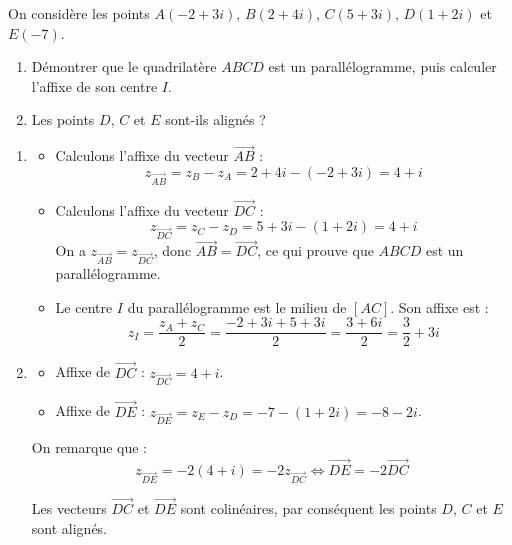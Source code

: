 \begin{methode}
	On considère les points $A(-2 + 3i)$, $B(2 + 4i)$, $C(5 + 3i)$, $D(1 + 2i)$ et $E(-7)$.
	\begin{enumerate}
		\item Démontrer que le quadrilatère $ABCD$ est un parallélogramme, puis calculer l'affixe de son centre $I$.
		\item Les points $D$, $C$ et $E$ sont-ils alignés ?
	\end{enumerate}

	\begin{correction}
		\nline
		\begin{enumerate}
			\item \begin{itemize}
				      \item Calculons l'affixe du vecteur $\vec{AB}$ :
				            \[
					            z_{\vec{AB}} = z_B - z_A = 2 + 4i - (-2 + 3i) = 4 + i
				            \]
				      \item Calculons l'affixe du vecteur $\vec{DC}$ :
				            \[
					            z_{\vec{DC}} = z_C - z_D = 5 + 3i - (1 + 2i) = 4 + i
				            \]
				            On a $z_{\vec{AB}} = z_{\vec{DC}}$, donc $\vec{AB} = \vec{DC}$, ce qui prouve que $ABCD$ est un parallélogramme.
				      \item Le centre $I$ du parallélogramme est le milieu de $[AC]$. Son affixe est :
				            \[
					            z_I = \frac{z_A + z_C}{2} = \frac{-2 + 3i + 5 + 3i}{2} = \frac{3 + 6i}{2} = \frac{3}{2} + 3i
				            \]
			      \end{itemize}
			\item \begin{itemize}
				      \item Affixe de $\vec{DC}$ : $z_{\vec{DC}} = 4 + i$.
				      \item Affixe de $\vec{DE}$ : $z_{\vec{DE}} = z_E - z_D = -7 - (1 + 2i) = -8 - 2i$.
			      \end{itemize}

			      On remarque que :
			      \[
				      z_{\vec{DE}} = -2(4 + i) = -2z_{\vec{DC}} \iff \vec{DE} = -2\vec{DC}
			      \]

			      Les vecteurs $\vec{DC}$ et $\vec{DE}$ sont colinéaires, par conséquent les points $D$, $C$ et $E$ sont alignés.
		\end{enumerate}


\end{correction}
\end{methode}
